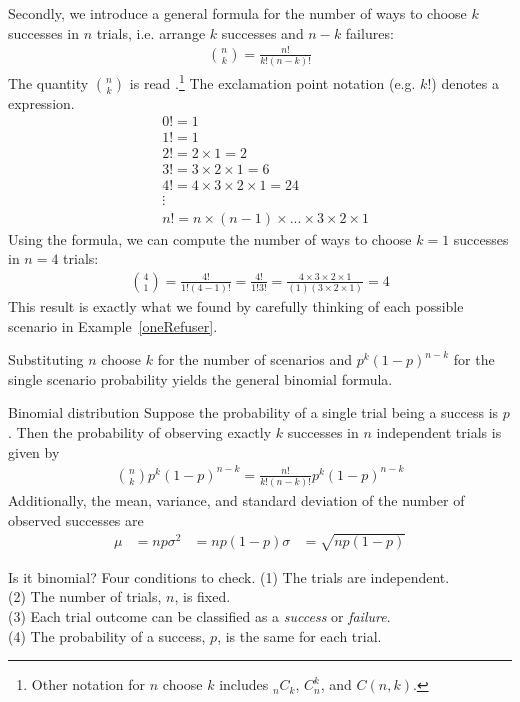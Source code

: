 Secondly, we introduce a general formula for the number of ways to choose $k$ successes in $n$ trials, i.e. arrange $k$ successes and $n-k$ failures:
\begin{align*}
{n\choose k} = \frac{n!}{k!(n-k)!}
\end{align*}
The quantity ${n\choose k}$ is read .\footnote{Other notation for $n$ choose $k$ includes $_nC_k$, $C_n^k$, and $C(n,k)$.} The exclamation point notation (e.g. $k!$) denotes a  expression.
\begin{align*}
& 0! = 1 \\
& 1! = 1 \\
& 2! = 2\times1 = 2 \\
& 3! = 3\times2\times1 = 6 \\
& 4! = 4\times3\times2\times1 = 24 \\
& \vdots \\
& n! = n\times(n-1)\times...\times3\times2\times1
\end{align*}
Using the formula, we can compute the number of ways to choose $k=1$ successes in $n=4$ trials:
\begin{align*}
{4 \choose 1} = \frac{4!}{1!(4-1)!}
  = \frac{4!}{1!3!} 
  = \frac{4\times3\times2\times1}{(1)(3\times2\times1)}
  = 4
\end{align*}
This result is exactly what we found by carefully thinking of each possible scenario in Example~\ref{oneRefuser}.

Substituting $n$ choose $k$ for the number of scenarios and $p^k(1-p)^{n-k}$ for the single scenario probability yields the general binomial formula.

\begin{onebox}{Binomial distribution}
  Suppose the probability of a single trial being a success is $p$. Then the probability of observing exactly $k$ successes in $n$ independent trials is given by\vspace{-1mm}
\begin{align*}
{n\choose k}p^k(1-p)^{n-k} = \frac{n!}{k!(n-k)!}p^k(1-p)^{n-k}
\end{align*}
Additionally, the mean, variance, and standard deviation of the number of observed successes are\vspace{-2mm}
\begin{align*}
\mu &= np
\sigma^2 &= np(1-p)
\sigma &= \sqrt{np(1-p)}
\end{align*}
\end{onebox}

\begin{onebox}{Is it binomial? Four conditions to check.}
\label{isItBinomialTipBox}%
(1) The trials are independent. \\
(2) The number of trials, $n$, is fixed. \\
(3) Each trial outcome can be classified as a \emph{success} or \emph{failure}. \\
(4) The probability of a success, $p$, is the same for each trial.
\end{onebox}

